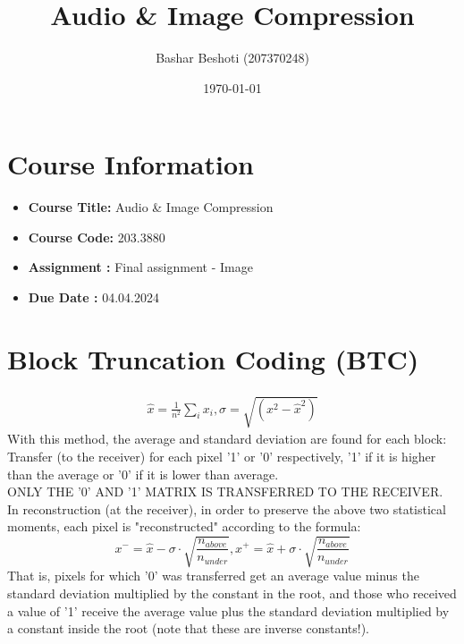 \documentclass[letterpaper, 12pt]{article}
\title{Audio \& Image Compression}
\author{Bashar Beshoti (207370248)
}
\date{\today}
\begin{document}
\maketitle

\section*{Course Information}
\begin{itemize}
    \item \textbf{Course Title:} Audio \& Image Compression  %
    \item \textbf{Course Code:} 203.3880
    \item \textbf{Assignment :} Final assignment - Image
    \item     \textbf{Due Date : } 04.04.2024

\end{itemize}


\newpage

\section{Block Truncation Coding (BTC)  }
\begin{align*}
    \boxed{\hat{x} = \frac{1}{n^2}\sum_{i} x_i , \sigma = \sqrt{(x^2 - \hat{x}^2)}}
\end{align*}
With this method, the average and standard deviation are found for each block:
Transfer (to the receiver) for each pixel '1' or '0' respectively, '1' if it is higher than the average or '0' if it is lower than average.\\
ONLY THE '0' AND '1' MATRIX IS TRANSFERRED TO THE RECEIVER.\\
In reconstruction (at the receiver), in order to preserve the above two statistical moments, each pixel is "reconstructed" according to the formula:
\[x^- = {\hat{x}-\sigma \cdot \sqrt{\frac{n_{above}}{n_{under}}}} , x^+ = {\hat{x}+\sigma \cdot \sqrt{\frac{n_{above}}{n_{under}}}}\]
That is, pixels for which '0' was transferred get an average value minus the standard deviation multiplied by the constant in the root, and those who received a value of '1' receive the average value plus the standard deviation multiplied by a constant inside the root (note that these are inverse constants!).\\
\end{document}
